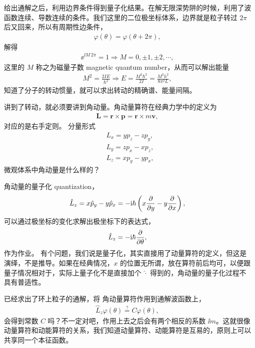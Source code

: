 给出通解之后，利用边界条件得到量子化结果。在解无限深势阱的时候，利用了波函数连续、导数连续的条件。我们这里的二位极坐标体系，边界就是粒子转过 $2\pi$ 后又回来，所以有周期性边条件，
\begin{align}
    \varphi(\theta) = \varphi(\theta + 2\pi),
\end{align}
解得
\begin{align}
    \ee^{\ii M\, 2\pi} = 1 \Rightarrow M = 0, \pm 1, \pm 2, \cdots,
\end{align}
这里的 $M$ 称之为磁量子数 magnetic quantum number，从而可以解出能量
\begin{align}
    M^2 = \frac{2IE}{\hbar^2} \Rightarrow E = \frac{M^2\hbar^2} {2I} = \frac{M^2h^2} {8\pi^2 L},
\end{align}
知道了分子的转动惯量，就可以求出转动的精确谱、能量间隔。


讲到了转动，就必须要讲到角动量。角动量算符在经典力学中的定义为
\begin{align}
    \bm L = \bm r \times \bm p = \bm r \times m\bm v, 
\end{align}
对应的是右手定则。
分量形式
\begin{align}
    &L_x = y p_z - zp_y, \\
    &L_y = z p_x - x p_z, \\
    &L_z = x p_y - y p_x, 
\end{align}
微观体系中角动量是什么样的？

角动量的量子化 quantization，
\begin{align}
    \hat L_z = x \hat p_y - y \hat p_x = - \mathrm{i} \hbar \left(x \pdv{y} - y \pdv{x}\right),
\end{align}
可以通过极坐标的变化求解出极坐标下的表达式，
\begin{align}
    \hat L_z = -\mathrm{i} \hbar \pdv{\theta},
\end{align}
作为作业。
有个问题，我们说是量子化，其实直接用了动量算符的定义，但这是演绎，不是推导。如果在经典情况，$x$ 的位置无所谓，放在算符前后均可，以便跟量子情况相对于，实际上量子化不是直接加个 $\hat\cdot$ 得到的，角动量的量子化过程不具有普适性。

已经求出了环上粒子的通解，将
角动量算符作用到通解波函数上，
\begin{align}
    \hat L_z \varphi(\theta) \overset{?}{=} C\varphi(\theta),
\end{align}
会得到常数 $C$ 吗？不一定对吧，作用上去之后会有两个相反的系数 $\ii m$。这就很像动量算符和动能算符的关系，我们知道动量算符、动能算符是互易的，原则上可以共享同一个本征函数。

